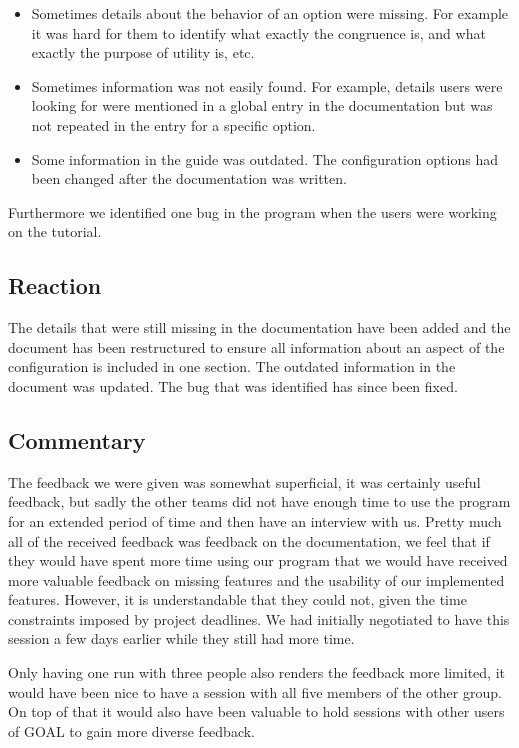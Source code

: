 \documentclass[11pt]{article}
\begin{document}
\begin{itemize}
	\item Sometimes details about the behavior of an option were missing. For example it was hard for them to identify what exactly the congruence is, and what exactly the purpose of utility is, etc.
	\item Sometimes information was not easily found. For example, details users were looking for were mentioned in a global entry in the documentation but was not repeated in the entry for a specific option.
	\item Some information in the guide was outdated. The configuration options had been changed after the documentation was written.
\end{itemize}

Furthermore we identified one bug in the program when the users were working on the tutorial. 
\subsection{Reaction}
The details that were still missing in the documentation have been added and the document has been restructured to ensure all information about an aspect of the configuration is included in one section. The outdated information in the document was updated. The bug that was identified has since been fixed.

\subsection{Commentary}
The feedback we were given was somewhat superficial, it was certainly useful feedback, but sadly the other teams did not have enough time to use the program for an extended period of time and then have an interview with us. Pretty much all of the received feedback was feedback on the documentation, we feel that if they would have spent more time using our program that we would have received more valuable feedback on missing features and the usability of our implemented features. However, it is understandable that they could not, given the time constraints imposed by project deadlines. We had initially negotiated to have this session a few days earlier while they still had more time.

Only having one run with three people also renders the feedback more limited, it would have been nice to have a session with all five members of the other group. On top of that it would also have been valuable to hold sessions with other users of GOAL to gain more diverse feedback.
\end{document}
